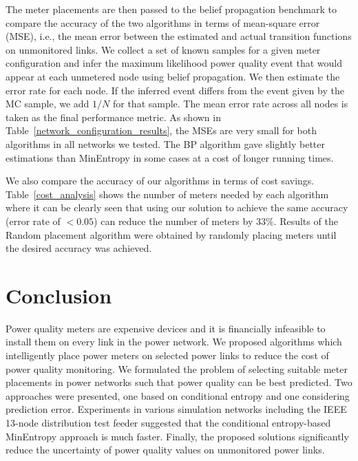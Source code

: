 The meter placements are then passed to the belief propagation benchmark to compare the accuracy of the two algorithms in terms of mean-square error (MSE), i.e., the mean error between the estimated and actual transition functions on unmonitored links. We collect a set of known samples for a given meter configuration and infer the maximum likelihood power quality event that would appear at each unmetered node using belief propagation. We then estimate the error rate for each node. If the inferred event differs from the event given by the MC sample, we add $1/N$ for that sample. The mean error rate across all nodes is taken as the final performance metric. As shown in Table~\ref{network_configuration_results}, the MSEs are very small for both algorithms in all networks we tested. The BP algorithm gave slightly better estimations than MinEntropy in some cases at a cost of longer running times.

We also compare the accuracy of our algorithms in terms of cost savings. Table~\ref{cost_analysis} shows the number of meters needed by each algorithm where it can be clearly seen that using our solution to achieve the same accuracy (error rate of $< 0.05$) can reduce the number of meters by 33\%. Results of the Random placement algorithm were obtained by randomly placing meters until the desired accuracy was achieved.


\section{Conclusion}
\label{sec:conclusion}
Power quality meters are expensive devices and it is financially infeasible to install them on every link in the power network. We proposed algorithms which intelligently place power meters on selected power links to reduce the cost of power quality monitoring. We formulated the problem of selecting suitable meter placements in power networks such that power quality can be best predicted. Two approaches were presented, one based on conditional entropy and one considering prediction error. Experiments in various simulation networks including the IEEE 13-node distribution test feeder suggested that the conditional entropy-based MinEntropy approach is much faster. Finally, the proposed solutions significantly reduce the uncertainty of power quality values on unmonitored power links.